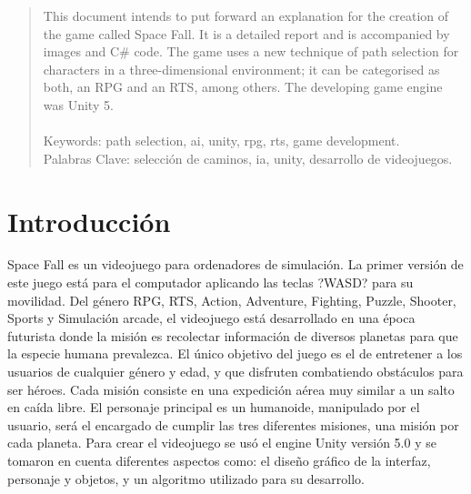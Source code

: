 \documentclass[12pt, conference]{IEEEtran}
\begin{document}




\maketitle

\begin{abstract}

This document intends to put forward an explanation for the creation of the game called Space Fall. It is a detailed report and is accompanied by images and C\# code. The game uses a new technique of path selection for characters in a three-dimensional environment; it can be categorised as both, an RPG and an RTS, among others. The developing game engine was Unity 5.\\ \\
Keywords: path selection, ai, unity, rpg, rts, game development.\\
Palabras Clave: selecci\'{o}n de caminos, ia, unity, desarrollo de videojuegos.
\end{abstract}





%
\IEEEpeerreviewmaketitle



\section{Introducci\'{o}n}

Space Fall es un videojuego para ordenadores de simulaci\'{o}n. La primer versi\'{o}n de este juego est\'{a} para el computador aplicando las teclas ?WASD? para su movilidad. Del g\'{e}nero RPG, RTS, Action, Adventure, Fighting, Puzzle, Shooter, Sports y Simulaci\'{o}n arcade, el videojuego est\'{a} desarrollado en una \'{e}poca futurista donde la misi\'{o}n es recolectar informaci\'{o}n de diversos planetas para que la especie humana prevalezca. El \'{u}nico objetivo del juego es el de entretener a los usuarios de cualquier g\'{e}nero y edad, y que disfruten combatiendo obst\'{a}culos para ser h\'{e}roes. Cada misi\'{o}n consiste en una expedici\'{o}n a\'{e}rea muy similar a un salto en ca\'{i}da libre. El personaje principal es un humanoide, manipulado por el usuario, ser\'{a} el encargado de cumplir las tres diferentes misiones, una misi\'{o}n por cada planeta. Para crear el videojuego se us\'{o} el engine Unity versi\'{o}n 5.0 y se tomaron en cuenta diferentes aspectos como: el dise\~{n}o gr\'{a}fico de la interfaz, personaje y objetos, y un algoritmo utilizado para su desarrollo.\\
\end{document}
